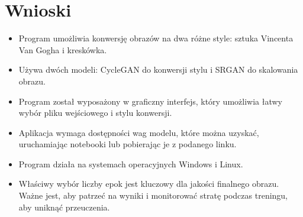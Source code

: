 \documentclass{article}
\begin{document}
\section{Wnioski}
\begin{itemize}
    \setlength\itemsep{0pt}
    \item Program umożliwia konwersję obrazów na dwa różne style: sztuka Vincenta Van Gogha i kreskówka.
    \item Używa dwóch modeli: CycleGAN do konwersji stylu i SRGAN do skalowania obrazu.
    \item Program został wyposażony w graficzny interfejs, który umożliwia łatwy wybór pliku wejściowego i stylu konwersji.
    \item Aplikacja wymaga dostępności wag modelu, które można uzyskać, uruchamiając notebooki lub pobierając je z podanego linku.
    \item Program działa na systemach operacyjnych Windows i Linux.
    \item Właściwy wybór liczby epok jest kluczowy dla jakości finalnego obrazu. Ważne jest, aby patrzeć na wyniki i monitorować stratę podczas treningu, aby uniknąć przeuczenia.
\end{itemize}
\end{document}
